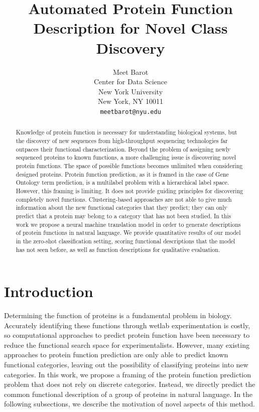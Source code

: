 \documentclass{article}
\title{Automated Protein Function Description for Novel Class Discovery}
\author{Meet Barot \\
        Center for Data Science\\
        New York University\\
        New York, NY 10011\\
        \texttt{meetbarot@nyu.edu}}
\begin{document}
\maketitle

\begin{abstract}
Knowledge of protein function is necessary for understanding biological systems, but the discovery of new sequences from high-throughput sequencing technologies far outpaces their functional characterization.
Beyond the problem of assigning newly sequenced proteins to known functions, a more challenging issue is discovering novel protein functions.
The space of possible functions becomes unlimited when considering designed proteins.
Protein function prediction, as it is framed in the case of Gene Ontology term prediction, is a multilabel problem with a hierarchical label space.
However, this framing is limiting. It does not provide guiding principles for discovering completely novel functions.
Clustering-based approaches are not able to give much information about the new functional categories that they predict; they can only predict that a protein may belong to a category that has not been studied.
In this work we propose a neural machine translation model in order to generate descriptions of protein functions in natural language.
We provide quantitative results of our model in the zero-shot classification setting, scoring functional descriptions that the model has not seen before, as well as function descriptions for qualitative evaluation.
\end{abstract}

\section{Introduction}

    Determining the function of proteins is a fundamental problem in biology.
    Accurately identifying these functions through wetlab experimentation is costly, so computational approaches to predict protein function have been necessary to reduce the functional search space for experimentalists.
    However, many existing approaches to protein function prediction are only able to predict known functional categories, leaving out the possibility of classifying proteins into new categories.
    In this work, we propose a framing of the protein function prediction problem that does not rely on discrete categories. Instead, we directly predict the common functional description of a group of proteins in natural language.
    In the following subsections, we describe the motivation of novel aspects of this method.
\end{document}
